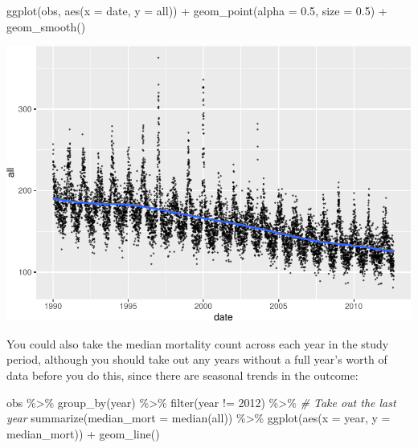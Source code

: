 \documentclass[
]{book}
\newenvironment{Shaded}{\begin{snugshade}}{\end{snugshade}}
\newcommand{\AttributeTok}[1]{\textcolor[rgb]{0.77,0.63,0.00}{#1}}
\newcommand{\CommentTok}[1]{\textcolor[rgb]{0.56,0.35,0.01}{\textit{#1}}}
\newcommand{\DecValTok}[1]{\textcolor[rgb]{0.00,0.00,0.81}{#1}}
\newcommand{\FloatTok}[1]{\textcolor[rgb]{0.00,0.00,0.81}{#1}}
\newcommand{\FunctionTok}[1]{\textcolor[rgb]{0.00,0.00,0.00}{#1}}
\newcommand{\NormalTok}[1]{#1}
\newcommand{\SpecialCharTok}[1]{\textcolor[rgb]{0.00,0.00,0.00}{#1}}
\begin{document}
\begin{Shaded}
\begin{Highlighting}[]
\FunctionTok{ggplot}\NormalTok{(obs, }\FunctionTok{aes}\NormalTok{(}\AttributeTok{x =}\NormalTok{ date, }\AttributeTok{y =}\NormalTok{ all)) }\SpecialCharTok{+} 
  \FunctionTok{geom\_point}\NormalTok{(}\AttributeTok{alpha =} \FloatTok{0.5}\NormalTok{, }\AttributeTok{size =} \FloatTok{0.5}\NormalTok{) }\SpecialCharTok{+} 
  \FunctionTok{geom\_smooth}\NormalTok{()}
\end{Highlighting}
\end{Shaded}

\includegraphics{adv_epi_analysis_files/figure-latex/unnamed-chunk-15-1.pdf}

You could also take the median mortality count across each year in the
study period, although you should take out any years without a full year's
worth of data before you do this, since there are seasonal trends in the
outcome:

\begin{Shaded}
\begin{Highlighting}[]
\NormalTok{obs }\SpecialCharTok{\%\textgreater{}\%} 
  \FunctionTok{group\_by}\NormalTok{(year) }\SpecialCharTok{\%\textgreater{}\%} 
  \FunctionTok{filter}\NormalTok{(year }\SpecialCharTok{!=} \DecValTok{2012}\NormalTok{) }\SpecialCharTok{\%\textgreater{}\%} \CommentTok{\# Take out the last year}
  \FunctionTok{summarize}\NormalTok{(}\AttributeTok{median\_mort =} \FunctionTok{median}\NormalTok{(all)) }\SpecialCharTok{\%\textgreater{}\%} 
  \FunctionTok{ggplot}\NormalTok{(}\FunctionTok{aes}\NormalTok{(}\AttributeTok{x =}\NormalTok{ year, }\AttributeTok{y =}\NormalTok{ median\_mort)) }\SpecialCharTok{+}
  \FunctionTok{geom\_line}\NormalTok{()}
\end{Highlighting}
\end{Shaded}
\end{document}
